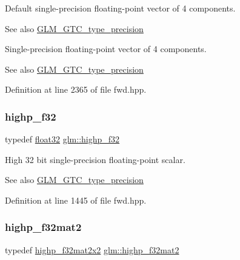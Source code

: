 Default single-\/precision floating-\/point vector of 4 components. \begin{DoxySeeAlso}{See also}
\hyperlink{group__gtc__type__precision}{G\+L\+M\+\_\+\+G\+T\+C\+\_\+type\+\_\+precision}
\end{DoxySeeAlso}
Single-\/precision floating-\/point vector of 4 components. \begin{DoxySeeAlso}{See also}
\hyperlink{group__gtc__type__precision}{G\+L\+M\+\_\+\+G\+T\+C\+\_\+type\+\_\+precision} 
\end{DoxySeeAlso}


Definition at line 2365 of file fwd.\+hpp.

\mbox{\label{group__gtc__type__precision_ga48d80b6fd3a40b71b2e414493832d1ca}} 
\subsubsection{\texorpdfstring{highp\+\_\+f32}{highp\_f32}}
{\footnotesize\ttfamily typedef \hyperlink{group__gtc__type__precision_ga814f2f65354b6588b067cc5c67a6b340}{float32} \hyperlink{group__gtc__type__precision_ga48d80b6fd3a40b71b2e414493832d1ca}{glm\+::highp\+\_\+f32}}

High 32 bit single-\/precision floating-\/point scalar. \begin{DoxySeeAlso}{See also}
\hyperlink{group__gtc__type__precision}{G\+L\+M\+\_\+\+G\+T\+C\+\_\+type\+\_\+precision} 
\end{DoxySeeAlso}


Definition at line 1445 of file fwd.\+hpp.

\mbox{\label{group__gtc__type__precision_gaed934f561aaf8ad891c0a8f5e719aea8}} 
\subsubsection{\texorpdfstring{highp\+\_\+f32mat2}{highp\_f32mat2}}
{\footnotesize\ttfamily typedef \hyperlink{group__gtc__type__precision_gaf3a2cc948ca6fd168391138ce6fdd100}{highp\+\_\+f32mat2x2} \hyperlink{group__gtc__type__precision_gaed934f561aaf8ad891c0a8f5e719aea8}{glm\+::highp\+\_\+f32mat2}}

